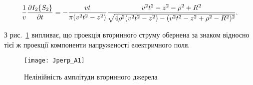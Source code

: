 %
\begin{equation} \begin{aligned} \label{eq:i2_partder}
\frac{1}{v} \frac{\partial  I_2 \{ S_2 \} }{\partial t} = 
- \frac{vt}{\pi (v^2t^2 - z^2) } \frac{ v^2t^2 - z^2 - \rho^2 + R^2 } 
{ \sqrt{ 4 \rho^2 (v^2t^2 - z^2) - (v^2t^2 - z^2 + \rho^2 - R^2)^2 } }.
\end{aligned} \end{equation}

З рис.~\ref{fig:jx_secondary} випливає, що проекція вторинного струму обернена 
за знаком відносно тієї ж проекції компоненти напруженості електричного поля.

\begin{figure}[h] \begin{center}
\texttt{[image: Jperp\_A1]}
\caption{Нелінійність амплітуди вторинного джерела}
\label{fig:jx_secondary}
\end{center} \end{figure}


